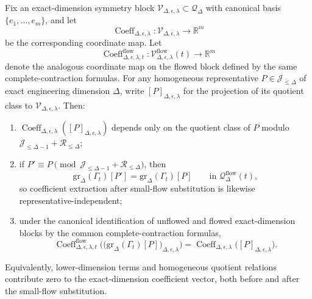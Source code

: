 \begin{lemma}\label{lem:LaneA_block_coeff_extract}
Fix an exact-dimension symmetry block $\mathscr V_{\Delta,\epsilon,\lambda}\subset \mathscr Q_{\Delta}$ with canonical basis
$\{e_1,\dots,e_m\}$, and let
\[
\operatorname{Coeff}_{\Delta,\epsilon,\lambda}:\mathscr V_{\Delta,\epsilon,\lambda}\longrightarrow \mathbb R^m
\]
be the corresponding coordinate map.
Let
\[
\operatorname{Coeff}^{\mathrm{flow}}_{\Delta,\epsilon,\lambda,t}:\mathscr V^{\mathrm{flow}}_{\Delta,\epsilon,\lambda}(t)\longrightarrow \mathbb R^m
\]
denote the analogous coordinate map on the flowed block defined by the same complete-contraction formulas.
For any homogeneous representative $P\in \mathscr J_{\le \Delta}$ of exact engineering dimension $\Delta$, write
$[P]_{\Delta,\epsilon,\lambda}$ for the projection of its quotient class to $\mathscr V_{\Delta,\epsilon,\lambda}$.
Then:
\begin{enumerate}[label=(\roman*),leftmargin=2.3em]
\item $\operatorname{Coeff}_{\Delta,\epsilon,\lambda}([P]_{\Delta,\epsilon,\lambda})$ depends only on the quotient class of $P$ modulo
$\mathscr J_{\le \Delta-1}+\mathscr R_{\le \Delta}$;
\item if $P'\equiv P\pmod{\mathscr J_{\le \Delta-1}+\mathscr R_{\le \Delta}}$, then
\[
\mathrm{gr}_{\Delta}(\Gamma_t)[P']
=
\mathrm{gr}_{\Delta}(\Gamma_t)[P]
\qquad\text{in }\mathscr Q^{\mathrm{flow}}_{\Delta}(t),
\]
so coefficient extraction after small-flow substitution is likewise representative-independent;
\item under the canonical identification of unflowed and flowed exact-dimension blocks by the common complete-contraction formulas,
\begin{equation}\label{eq:LaneA_coeff_extract_identity}
\operatorname{Coeff}^{\mathrm{flow}}_{\Delta,\epsilon,\lambda,t}\Big(\big(\mathrm{gr}_{\Delta}(\Gamma_t)[P]\big)_{\Delta,\epsilon,\lambda}\Big)
=
\operatorname{Coeff}_{\Delta,\epsilon,\lambda}\big([P]_{\Delta,\epsilon,\lambda}\big).
\end{equation}
\end{enumerate}
Equivalently, lower-dimension terms and homogeneous quotient relations contribute zero to the exact-dimension coefficient vector,
both before and after the small-flow substitution.
\end{lemma}

